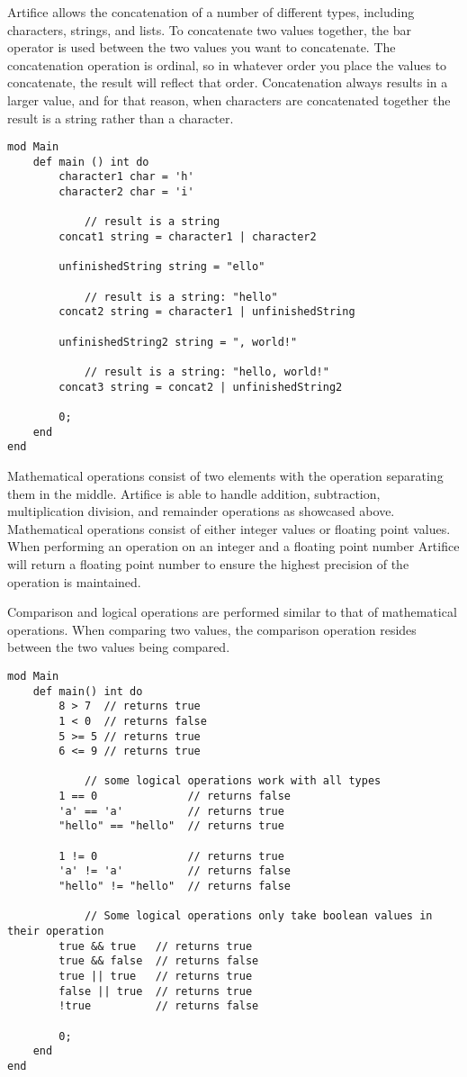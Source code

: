 \documentclass{article}
\begin{document}
Artifice allows the concatenation of a number of different types, including characters, strings, and lists. To concatenate two values together, the bar operator 
is used between the two values you want to concatenate. The concatenation operation is ordinal, so in whatever order you place the values to concatenate, the
result will reflect that order. Concatenation always results in a larger value, and for that reason, when characters are concatenated together the result is a
string rather than a character.

\begin{lstlisting}
mod Main
	def main () int do
		character1 char = 'h'
		character2 char = 'i'

			// result is a string
		concat1 string = character1 | character2

		unfinishedString string = "ello"

			// result is a string: "hello"
		concat2 string = character1 | unfinishedString

		unfinishedString2 string = ", world!"

			// result is a string: "hello, world!"
		concat3 string = concat2 | unfinishedString2

		0;
	end
end
\end{lstlisting}

Mathematical operations consist of two elements with the operation separating them in the middle. Artifice is able to handle addition, subtraction, multiplication
division, and remainder operations as showcased above. Mathematical operations consist of either integer values or floating point values. When performing an
operation on an integer and a floating point number Artifice will return a floating point number to ensure the highest precision of the operation is maintained.

Comparison and logical operations are performed similar to that of mathematical operations. When comparing two values, the comparison operation resides between the two
values being compared.

\begin{lstlisting}
mod Main
	def main() int do
		8 > 7  // returns true
		1 < 0  // returns false
		5 >= 5 // returns true
		6 <= 9 // returns true

			// some logical operations work with all types
		1 == 0      		// returns false
		'a' == 'a'  		// returns true
		"hello" == "hello"  // returns true

		1 != 0 			    // returns true
		'a' != 'a'  		// returns false
		"hello" != "hello"  // returns false

			// Some logical operations only take boolean values in their operation
		true && true   // returns true
		true && false  // returns false
		true || true   // returns true
		false || true  // returns true
		!true		   // returns false

		0;
	end
end
\end{lstlisting}
\end{document}
